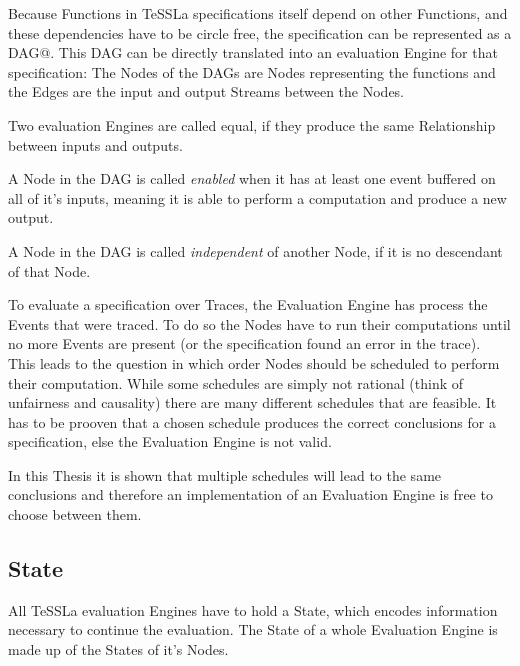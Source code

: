 Because Functions in TeSSLa specifications itself depend on other Functions, and these dependencies have to be circle free,
the specification can be represented as a DAG@.
This DAG can be directly translated into an evaluation Engine for that specification: The Nodes of the DAGs are Nodes representing the functions and the Edges are the input and output Streams between the Nodes.

\begin{definition}
  Two evaluation Engines are called equal, if they produce the same Relationship between inputs and outputs.
\label{def:equality_eval_engine}
\end{definition}

\begin{definition}
A Node in the DAG is called \emph{enabled} when it has at least one event buffered on all of it's inputs, meaning it is able to perform a computation and produce a new output.
\label{def:node_enabled}
\end{definition}

\begin{definition}
A Node in the DAG is called \emph{independent} of another Node, if it is no descendant of that Node.
\label{def:node_independent}
\end{definition}


To evaluate a specification over Traces, the Evaluation Engine has process the Events that were traced.
To do so the Nodes have to run their computations until no more Events are present (or the specification found an error in the trace).
This leads to the question in which order Nodes should be scheduled to perform their computation.
While some schedules are simply not rational (think of unfairness and causality) there are many different schedules that are feasible.
It has to be prooven that a chosen schedule produces the correct conclusions for a specification, else the Evaluation Engine is not valid.

In this Thesis it is shown that multiple schedules will lead to the same conclusions and therefore an implementation of an Evaluation Engine is free to choose between them.

\subsection{State}
\label{sec:concepts:def:state}

All TeSSLa evaluation Engines have to hold a State, which encodes information necessary to continue the evaluation.
The State of a whole Evaluation Engine is made up of the States of it's Nodes.

